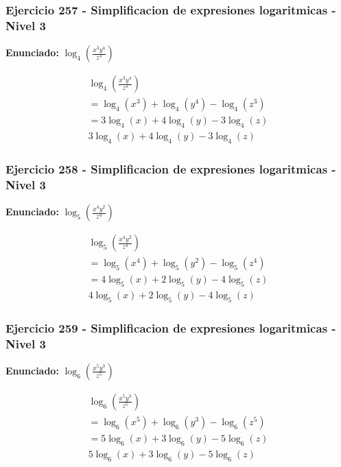 \documentclass[12pt,a4paper]{article}
\begin{document}
\subsubsection*{Ejercicio 257 - Simplificacion de expresiones logaritmicas - Nivel 3}
\textbf{Enunciado:} \(\log_{4}\left(\frac{x^{3}y^{4}}{z^{3}}\right)\)

\[
\begin{aligned}
\log_{4}\left(\frac{x^{3}y^{4}}{z^{3}}\right)\\
=\log_{4}\left(x^{3}\right)+\log_{4}\left(y^{4}\right)-\log_{4}\left(z^{3}\right)\\
=3\log_{4}\left(x\right)+4\log_{4}\left(y\right)-3\log_{4}\left(z\right)\\
\boxed{3\log_{4}\left(x\right)+4\log_{4}\left(y\right)-3\log_{4}\left(z\right)}
\end{aligned}
\]


\subsubsection*{Ejercicio 258 - Simplificacion de expresiones logaritmicas - Nivel 3}
\textbf{Enunciado:} \(\log_{5}\left(\frac{x^{4}y^{2}}{z^{4}}\right)\)

\[
\begin{aligned}
\log_{5}\left(\frac{x^{4}y^{2}}{z^{4}}\right)\\
=\log_{5}\left(x^{4}\right)+\log_{5}\left(y^{2}\right)-\log_{5}\left(z^{4}\right)\\
=4\log_{5}\left(x\right)+2\log_{5}\left(y\right)-4\log_{5}\left(z\right)\\
\boxed{4\log_{5}\left(x\right)+2\log_{5}\left(y\right)-4\log_{5}\left(z\right)}
\end{aligned}
\]


\subsubsection*{Ejercicio 259 - Simplificacion de expresiones logaritmicas - Nivel 3}
\textbf{Enunciado:} \(\log_{6}\left(\frac{x^{5}y^{3}}{z^{5}}\right)\)

\[
\begin{aligned}
\log_{6}\left(\frac{x^{5}y^{3}}{z^{5}}\right)\\
=\log_{6}\left(x^{5}\right)+\log_{6}\left(y^{3}\right)-\log_{6}\left(z^{5}\right)\\
=5\log_{6}\left(x\right)+3\log_{6}\left(y\right)-5\log_{6}\left(z\right)\\
\boxed{5\log_{6}\left(x\right)+3\log_{6}\left(y\right)-5\log_{6}\left(z\right)}
\end{aligned}
\]
\end{document}
